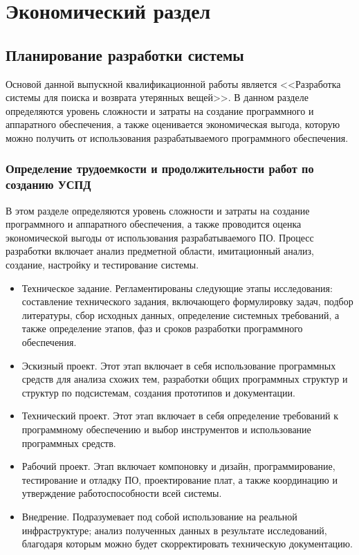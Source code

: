 \section{Экономический раздел}
\label{sec:economy}

\subsection{Планирование разработки системы}

Основой данной выпускной квалификационной работы является <<Разработка системы для поиска и возврата утерянных вещей>>. В данном разделе определяются уровень сложности и затраты на создание программного и аппаратного обеспечения, а также оценивается экономическая выгода, которую можно получить от использования разрабатываемого программного обеспечения.

\subsubsection{Определение трудоемкости и продолжительности работ по созданию УСПД}

В этом разделе определяются уровень сложности и затраты на создание программного и аппаратного обеспечения, а также проводится оценка экономической выгоды от использования разрабатываемого ПО. Процесс разработки включает анализ предметной области, имитационный анализ, создание, настройку и тестирование системы.

\begin{itemize}	
	\item Техническое задание. Регламентированы следующие этапы исследования: составление технического задания, включающего формулировку задач, подбор литературы, сбор исходных данных, определение системных требований, а также определение этапов, фаз и сроков разработки программного обеспечения.
	
	\item Эскизный проект. Этот этап включает в себя использование программных средств для анализа схожих тем, разработки общих программных структур и структур по подсистемам, создания прототипов и документации.
	
	\item Технический проект. Этот этап включает в себя определение требований к программному обеспечению и выбор инструментов и использование программных средств.
	
	\item Рабочий проект. Этап включает компоновку и дизайн, программирование, тестирование и отладку ПО, проектирование плат, а также координацию и утверждение работоспособности всей системы.
	
	\item Внедрение. Подразумевает под собой использование на реальной инфраструктуре; анализ полученных данных в результате исследований, благодаря которым можно будет скорректировать техническую документацию.
\end{itemize}

